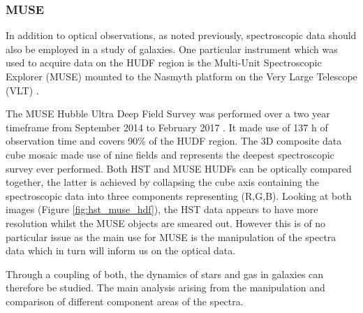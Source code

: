 \documentclass[12pt, twocolumn]{revtex4-1}    %
\begin{document}


\subsubsection*{MUSE}

In addition to optical observations, as noted previously, spectroscopic data should also be employed in a study of galaxies. One particular instrument which was used to acquire data on the HUDF region is the Multi-Unit Spectroscopic Explorer (MUSE) mounted to the Nasmyth platform on the Very Large Telescope (VLT) \citep{bacon_muse_proposal}. 


The MUSE Hubble Ultra Deep Field Survey was performed over a two year timeframe from September 2014 to February 2017 \citep{bacon_muse_hudf}. It made use of 137 h of observation time and covers 90\% of the HUDF region. The 3D composite data cube mosaic made use of nine fields and represents the deepest spectroscopic survey ever performed. Both HST and MUSE HUDFs can be optically compared together, the latter is achieved by collapsing the cube axis containing the spectroscopic data into three components representing (R,G,B). Looking at both images (Figure \ref{fig:hst_muse_hdf}), the HST data appears to have more resolution whilst the MUSE objects are smeared out. However this is of no particular issue as the main use for MUSE is the manipulation of the spectra data which in turn will inform us on the optical data.




Through a coupling of both, the dynamics of stars and gas in galaxies can therefore be studied. The main analysis arising from the manipulation and comparison of different component areas of the spectra.


\end{document}
